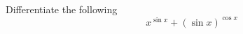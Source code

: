 \documentclass[14pt,fleqn]{extarticle}
\begin{document}
 

Differentiate the following 
\[ \qquad x^{\sin x} + \left(\sin x \right)^{\cos x} \] 
\end{document}
